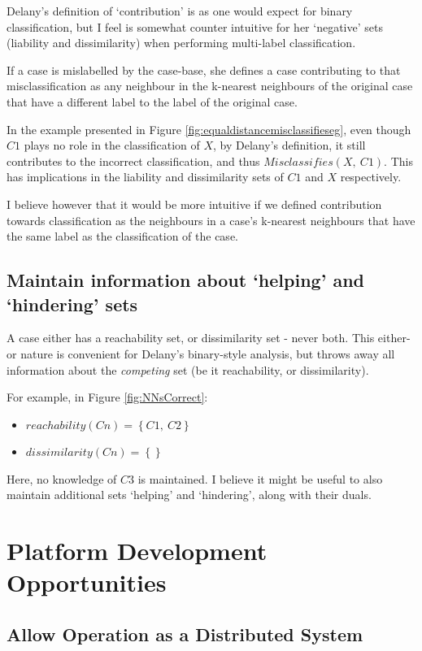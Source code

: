 \documentclass[a4paper,11pt]{report}
\begin{document}
Delany's definition of `contribution' is as one would expect for binary classification, but I feel is somewhat counter intuitive for her `negative' sets (liability and dissimilarity) when performing multi-label classification.

If a case is mislabelled by the case-base, she defines a case contributing to that misclassification as any neighbour in the k-nearest neighbours of the original case that have a different label to the label of the original case. 

In the example presented in Figure \ref{fig:equaldistancemisclassifieseg}, even though $C1$ plays no role in the classification of $X$, by Delany's definition, it still contributes to the incorrect classification, and thus $Misclassifies(X,~C1)$. This has implications in the liability and dissimilarity sets of $C1$ and $X$ respectively. 

I believe however that it would be more intuitive if we defined contribution towards classification as the neighbours in a case's k-nearest neighbours that have the same label as the classification of the case.

\subsection{Maintain information about `helping' and `hindering' sets}
A case either has a reachability set, or dissimilarity set - never both. This either-or nature is convenient for Delany's binary-style analysis, but throws away all information about the \emph{competing} set (be it reachability, or dissimilarity).

For example, in Figure \ref{fig:NNsCorrect}:
\begin{itemize}
	\item $reachability(Cn)=\left\{C1,~C2\right\} $
	\item $dissimilarity(Cn)=\left\{ \right\} $
\end{itemize}

Here, no knowledge of $C3$ is maintained. I believe it might be useful to also maintain additional sets `helping' and `hindering', along with their duals.

\section{Platform Development Opportunities}

\subsection{Allow Operation as a Distributed System}
\end{document}
